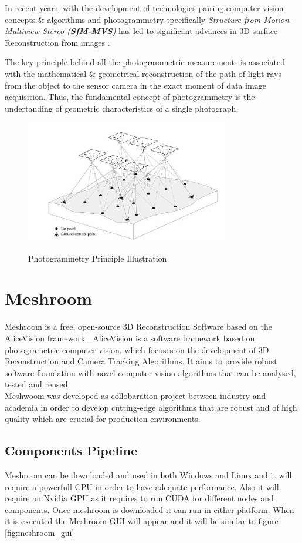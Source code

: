 \documentclass[12pt]{report}
\begin{document}
In recent years, with the development of technologies pairing computer vision concepts \& algorithms and photogrammetry specifically \textit{Structure from Motion-Multiview Stereo (\textbf{SfM-MVS})}
has led to significant advances in 3D surface Reconstruction from images .

The key principle behind all the photogrammetric measurements is associated with the mathematical \& geometrical reconstruction of the path of light rays from the object to the sensor camera in the exact moment of data image acquisition.
Thus, the fundamental concept of photogrammetry is the undertanding of geometric characteristics of a single photograph.

\begin{figure}[h]
  \centering
  \includegraphics[width=0.8\textwidth]{photogrammetry.png}
  \caption{Photogrammetry Principle Illustration}\cite[]{photogrammetry_def}
  \label{fig:photogrammetry_principle} 
\end{figure}

\section{Meshroom}
Meshroom is a free, open-source 3D Reconstruction Software based on the AliceVision framework .
AliceVision is a software framework based on photogrametric computer vision.  which focuses on the development of 3D Reconstruction and Camera Tracking Algorithms.
It aims to provide robust software foundation with novel computer vision algorithms that can be analysed, tested and reused.\\
Meshwoom was developed as collobaration project between industry and academia in order to develop cutting-edge algorithms that are robust and of high quality which are crucial for production environments.

\subsection*{Components Pipeline}
Meshroom can be downloaded and used in both Windows and Linux and it will require a powerfull CPU in order to have adequate performance. Also it will require an Nvidia GPU as it requires to run CUDA for different nodes and components.
Once meshroom is downloaded it can run in either platform. When it is executed the Meshroom GUI will appear and it will be similar to figure \ref{fig:meshroom_gui}
\end{document}
